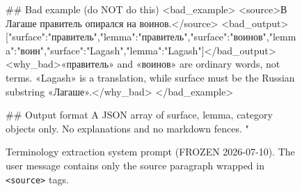 \begin{figure}[ht!]
\begin{prompt}
## Bad example (do NOT do this)
<bad_example>
<source>В Лагаше правитель опирался на воинов.</source>
<bad_output>[{"surface":"правитель","lemma":"правитель"},{"surface":"воинов","lemma":"воин"},{"surface":"Lagash","lemma":"Lagash"}]</bad_output>
<why_bad>«правитель» and «воинов» are ordinary words, not terms. «Lagash» is a translation, while surface must be the Russian substring «Лагаше».</why_bad>
</bad_example>

## Output format
A JSON array of {surface, lemma, category} objects only. No explanations and
no markdown fences.
"
\end{prompt}
\caption{Terminology extraction system prompt (FROZEN 2026-07-10). The user message contains only the source paragraph wrapped in \texttt{<source>} tags.}
\label{appx:ner-prompt}
\end{figure}
